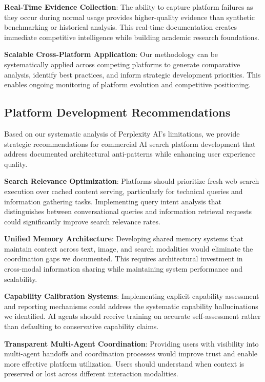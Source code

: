 \documentclass[12pt]{article}
\begin{document}
\textbf{Real-Time Evidence Collection}: The ability to capture platform failures as they occur during normal usage provides higher-quality evidence than synthetic benchmarking or historical analysis. This real-time documentation creates immediate competitive intelligence while building academic research foundations.

\textbf{Scalable Cross-Platform Application}: Our methodology can be systematically applied across competing platforms to generate comparative analysis, identify best practices, and inform strategic development priorities. This enables ongoing monitoring of platform evolution and competitive positioning.

\subsection{Platform Development Recommendations}

Based on our systematic analysis of Perplexity AI's limitations, we provide strategic recommendations for commercial AI search platform development that address documented architectural anti-patterns while enhancing user experience quality.

\textbf{Search Relevance Optimization}: Platforms should prioritize fresh web search execution over cached content serving, particularly for technical queries and information gathering tasks. Implementing query intent analysis that distinguishes between conversational queries and information retrieval requests could significantly improve search relevance rates.

\textbf{Unified Memory Architecture}: Developing shared memory systems that maintain context across text, image, and search modalities would eliminate the coordination gaps we documented. This requires architectural investment in cross-modal information sharing while maintaining system performance and scalability.

\textbf{Capability Calibration Systems}: Implementing explicit capability assessment and reporting mechanisms could address the systematic capability hallucinations we identified. AI agents should receive training on accurate self-assessment rather than defaulting to conservative capability claims.

\textbf{Transparent Multi-Agent Coordination}: Providing users with visibility into multi-agent handoffs and coordination processes would improve trust and enable more effective platform utilization. Users should understand when context is preserved or lost across different interaction modalities.
\end{document}
